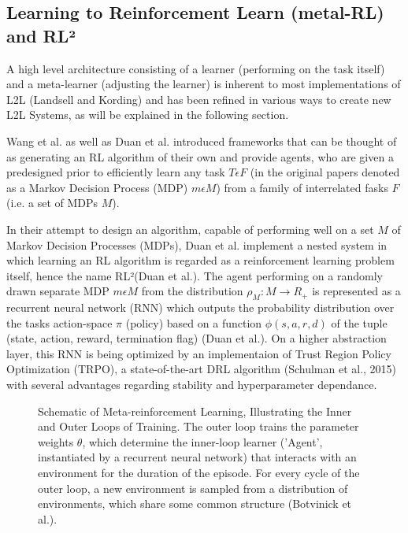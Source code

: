 \documentclass[letterpaper, 10 pt, conference]{ieeeconf}  %
\begin{document}
\subsection{Learning to Reinforcement Learn (metal-RL) and RL²}

A high level architecture consisting of a learner (performing on the task itself) and a meta-learner (adjusting the learner) is
inherent to most implementations of L2L (Landsell and Kording) and has been refined in various ways to create new L2L Systems, as will be
explained in the following section.

Wang et al. as well as Duan et al. introduced frameworks that can be thought of as generating an RL algorithm of their own and
provide agents, who are given a predesigned prior to efficiently learn any task $T \epsilon F$ (in the original papers denoted as 
a Markov Decision Process (MDP) $m \epsilon M$) from a family of interrelated fasks $F$(i.e. a set of MDPs $M$). 

In their attempt to design an algorithm, capable of performing well on a set $M$ of Markov Decision Processes (MDPs), Duan et al. implement a nested
system in which learning an RL algorithm is regarded as a reinforcement learning problem itself, hence the name RL²(Duan et al.). The agent performing 
on a randomly drawn separate MDP $m \epsilon M$ from the distribution $\rho_{M} : M \longrightarrow R_{+}$ is represented as a recurrent neural
network (RNN) which outputs the probability distribution over the tasks action-space $\pi$ (policy) based on a function $\phi (s,a,r,d)$ of 
the tuple (state, action, reward, termination flag) (Duan et al.). On a higher abstraction layer, this RNN is being 
optimized by an implementaion of Trust Region Policy Optimization (TRPO), a 
state-of-the-art DRL algorithm (Schulman et al., 2015) with several advantages regarding stability and hyperparameter dependance.\newline

\begin{figure}[thpb]
        \centering
  \caption{Schematic of Meta-reinforcement Learning, Illustrating the Inner and Outer Loops of Training. The
  outer loop trains the parameter weights $\theta$, which determine the inner-loop learner (’Agent’, instantiated by a recurrent
  neural network) that interacts with an environment for the duration of the episode. For every cycle of the outer loop, a new
  environment is sampled from a distribution of environments, which share some common structure (Botvinick et al.).}
        \label{figurelabel}
     \end{figure}
\end{document}
